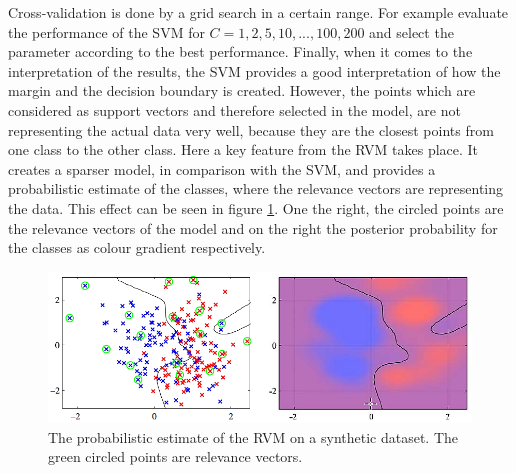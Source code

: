 Cross-validation is done by a grid search in a certain range.
For example evaluate the performance of the \ac{SVM} for $C={1,2,5,10,...,100,200}$ and select the parameter according to the best performance.\cite{Chen.2009}\newline
Finally, when it comes to the interpretation of the results, the \ac{SVM} provides a good interpretation of how the margin and the decision boundary is created.
However, the points which are considered as support vectors and therefore selected in the model, are not representing the actual data very well, because they are the closest points from one class to the other class.\cite[p. 326]{Bishop.2009}\newline
Here a key feature from the \ac{RVM} takes place. It creates a sparser model, in comparison with the \ac{SVM}, and provides a probabilistic estimate of the classes, where the relevance vectors are representing the data.\cite[p. 335-356]{Bishop.2009}\newline
This effect can be seen in figure \ref{FigRVMProbEst}.
One the right, the circled points are the relevance vectors of the model and on the right the posterior probability for the classes as colour gradient respectively.
\begin{figure}
	\centering
	\includegraphics[width=.8\linewidth]{figures/RVMProbEst.png}
	\caption[Probabilitc Estimate of the RVM]{The probabilistic estimate of the \acs{RVM} on a synthetic dataset. The green circled points are relevance vectors.\cite[p. 356]{Bishop.2009}}
	\label{FigRVMProbEst}
\end{figure}

